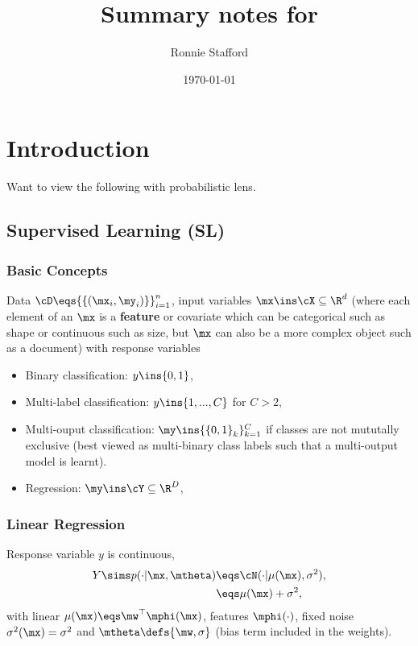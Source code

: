 \documentclass[11pt,a4paper]{report}
\title{Summary notes for\\\citetitle{book-murphy-2012-ml}}
\author{Ronnie Stafford}
\date{\today}
\begin{document}
\maketitle	

\chapter{Introduction}

Want to view the following with probabilistic lens.

\section{Supervised Learning (SL)}

\subsection{Basic Concepts}
Data $\cD\eqs{\{(\mx_{i}, \my_{i})\}}_{i=1}^{n}$, input variables $\mx\ins\cX\subseteq\R^{d}$ (where each element of an $\mx$ is a {\bf feature} or covariate which can be categorical such as shape or continuous such as size, but $\mx$ can also be a more complex object such as a document) with response variables
\begin{itemize}
	\item Binary classification: $y\ins\{0,1\}$, 
	\item Multi-label classification: $y\ins\{1,...,C\}$ for $C>2$,
	\item Multi-ouput classification: $\my\ins\{{\{0,1\}}_{k}\}_{k=1}^{C}$
	if classes are not mututally exclusive (best viewed as multi-binary class labels such that a multi-output model is learnt).
	\item Regression: $\my\ins\cY\subseteq\R^{D}$,
\end{itemize}

\subsection {Linear Regression}
Response variable $y$ is continuous,
\begin{align}
	Y\sims p(\cdot|\mx,\mtheta)&\eqs\cN(\cdot|\mu(\mx),\sigma^{2}),\\
	&\eqs \mu(\mx)+\sigma^{2},
\end{align}
with linear $\mu(\mx)\eqs\mw^{\top}\mphi(\mx)$, features $\mphi(\cdot)$, fixed noise $\sigma^{2}(\mx)=\sigma^{2}$ and $\mtheta\defs\{\mw,\sigma\}$ (bias term included in the weights).
\end{document}
